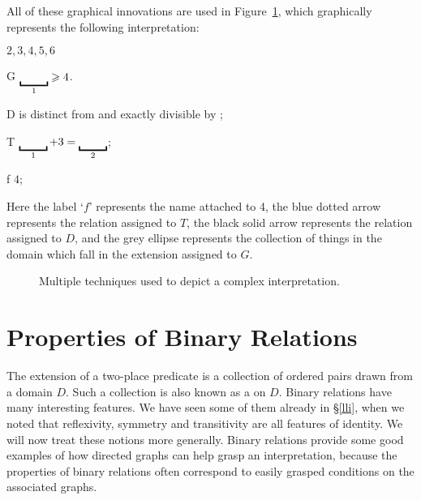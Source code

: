 All of these graphical innovations are used in Figure~\ref{fig:complex}, which  graphically represents the following interpretation: \begin{ekey}
	\item[\domain] $2,3,4,5,6$
	\item[G] $\gap{1} \geqslant 4$. 
	\item[D]  is distinct from and exactly divisible by ;
	\item[T] $\gap{1} + 3 = \gap{2}$;
	\item[f] $4$;
\end{ekey} 
Here the label `$f$' represents the name attached to 4, the blue dotted arrow represents the relation assigned to $T$, the black solid arrow represents the relation assigned to $D$, and the grey ellipse represents the collection of things in the domain which fall in the extension assigned to $G$. 
\begin{figure}[b]
\caption{\label{fig:complex}Multiple techniques used to depict a complex interpretation.}
\end{figure}

\section{Properties of Binary Relations} \label{binary}

The extension of a two-place predicate is a collection of ordered pairs drawn from a domain $D$. Such a collection is also known as a  on $D$. Binary relations have many interesting features. We have seen some of them already in §\ref{lli}, when we noted that reflexivity, symmetry and transitivity are all features of identity. We will now treat these notions more generally. Binary relations provide some good examples of how directed graphs can help grasp an interpretation, because the properties of binary relations often correspond to easily grasped conditions on the associated graphs.

